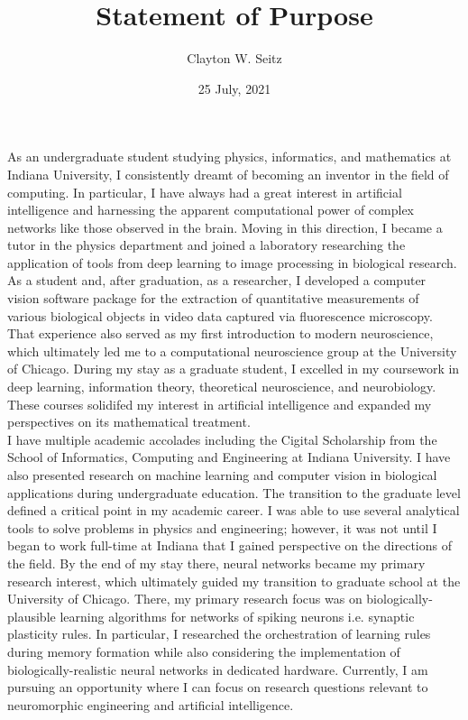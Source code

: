 \documentclass{article}
\title{Statement of Purpose}
\author{Clayton W. Seitz}
\date{25 July, 2021}
\begin{document}
  \maketitle%
\vspace{0.4in}

\indent As an undergraduate student studying physics, informatics, and mathematics at Indiana University, I consistently dreamt of becoming an inventor in the field of computing. In particular, I have always had a great interest in artificial intelligence and harnessing the apparent computational power of complex networks like those observed in the brain. Moving in this direction, I became a tutor in the physics department and joined a laboratory researching the application of tools from deep learning to image processing in biological research. As a student and, after graduation, as a researcher, I developed a computer vision software package for the extraction of quantitative measurements of various biological objects in video data captured via fluorescence microscopy. That experience also served as my first introduction to modern neuroscience, which ultimately led me to a computational neuroscience group at the University of Chicago. During my stay as a graduate student, I excelled in my coursework in deep learning, information theory, theoretical neuroscience, and neurobiology. These courses solidifed my interest in artificial intelligence and expanded my perspectives on its mathematical treatment.\\
\indent I have multiple academic accolades including the Cigital Scholarship from the School of Informatics, Computing and Engineering at Indiana University. I have also presented research on machine learning and computer vision in biological applications during undergraduate education. The transition to the graduate level defined a critical point in my academic career. I was able to use several analytical tools to solve problems in physics and engineering; however, it was not until I began to work full-time at Indiana that I gained perspective on the directions of the field. By the end of my stay there, neural networks became my primary research interest, which ultimately guided my transition to graduate school at the University of Chicago. There, my primary research focus was on biologically-plausible learning algorithms for networks of spiking neurons i.e. synaptic plasticity rules. In particular, I researched the orchestration of learning rules during memory formation while also considering the implementation of biologically-realistic neural networks in dedicated hardware. Currently, I am pursuing an opportunity where I can focus on research questions relevant to neuromorphic engineering and artificial intelligence.\\
\end{document}
